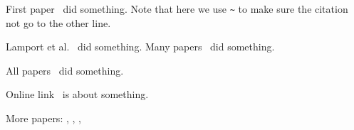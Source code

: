 First paper~\cite{goossens1994latex} did something. Note that here we use \verb|~| to make sure the citation not go to the other line. 

Lamport et al.~\cite{lamport1994latex} did something.
Many papers~\cite{makuuchi2000progress,yassin1994latex} did something.


All papers~\cite{makuuchi2000progress,yassin1994latex,
	goossens1994latex,lamport1994latex} did something.

Online link~\cite{onlineWindows} is about something.

More papers: \cite{colu92}, \cite{goossens1994latex}, \cite{jame76}, \cite{colu92,phil99,gree00,smit54}
